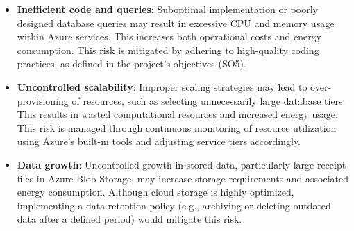 \begin{itemize} [leftmargin=0.75cm, noitemsep, label=$\bullet$]

    \item \textbf{Inefficient code and queries}: Suboptimal implementation or poorly designed database queries may result in excessive CPU and memory usage within Azure services. This increases both operational costs and energy consumption. This risk is mitigated by adhering to high-quality coding practices, as defined in the project's objectives (SO5).

    \vspace{1cm}

    \item \textbf{Uncontrolled scalability}: Improper scaling strategies may lead to over-provisioning of resources, such as selecting unnecessarily large database tiers. This results in wasted computational resources and increased energy usage. This risk is managed through continuous monitoring of resource utilization using Azure's built-in tools and adjusting service tiers accordingly.

    \item \textbf{Data growth}: Uncontrolled growth in stored data, particularly large receipt files in Azure Blob Storage, may increase storage requirements and associated energy consumption. Although cloud storage is highly optimized, implementing a data retention policy (e.g., archiving or deleting outdated data after a defined period) would mitigate this risk.

\end{itemize}